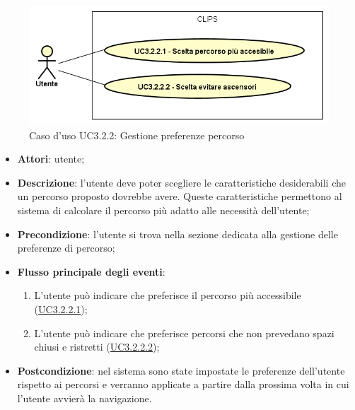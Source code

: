 \documentclass[../AnalisiDeiRequisiti.tex]{subfiles}
\begin{document}
        \begin{figure}[!h]
            \centering
            \includegraphics[scale=0.95, width=\textwidth]{img/UC3-2-2.png}
            \caption{Caso d'uso UC3.2.2: Gestione preferenze percorso}\label{fig:UC3.2.2} 
        \end{figure}
\begin{itemize}
\item \textbf{Attori}: utente;
\item \textbf{Descrizione}: l'utente deve poter scegliere le caratteristiche desiderabili che un percorso proposto dovrebbe avere. Queste caratteristiche permettono al sistema di calcolare il percorso più adatto alle necessità dell'utente; 
      \item \textbf{Precondizione}: l'utente si trova nella sezione dedicata alla gestione delle preferenze di percorso;

        \item \textbf{Flusso principale degli eventi}:
          \begin{enumerate}
          \item L'utente può indicare che preferisce il percorso più accessibile (\hyperlink{UC3.2.2.1}{UC3.2.2.1});
          \item L'utente può indicare che preferisce percorsi che non prevedano spazi chiusi e ristretti  (\hyperlink{UC3.2.2.2}{UC3.2.2.2});

      \end{enumerate}
    \item \textbf{Postcondizione}: nel sistema sono state impostate le preferenze dell'utente rispetto ai percorsi e verranno applicate a partire dalla prossima volta in cui l'utente avvierà la navigazione.
  \end{itemize}
\hypertarget{UC3.2.2.1}{}
\end{document}
